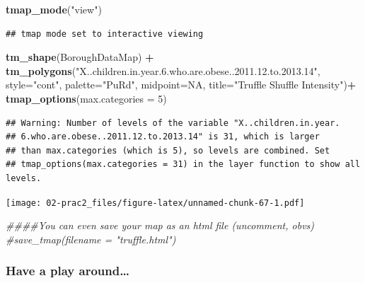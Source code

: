 \documentclass[]{book}
\newenvironment{Shaded}{\begin{snugshade}}{\end{snugshade}}
\newcommand{\CommentTok}[1]{\textcolor[rgb]{0.56,0.35,0.01}{\textit{#1}}}
\newcommand{\DataTypeTok}[1]{\textcolor[rgb]{0.13,0.29,0.53}{#1}}
\newcommand{\DecValTok}[1]{\textcolor[rgb]{0.00,0.00,0.81}{#1}}
\newcommand{\KeywordTok}[1]{\textcolor[rgb]{0.13,0.29,0.53}{\textbf{#1}}}
\newcommand{\NormalTok}[1]{#1}
\newcommand{\OperatorTok}[1]{\textcolor[rgb]{0.81,0.36,0.00}{\textbf{#1}}}
\newcommand{\OtherTok}[1]{\textcolor[rgb]{0.56,0.35,0.01}{#1}}
\newcommand{\StringTok}[1]{\textcolor[rgb]{0.31,0.60,0.02}{#1}}
\begin{document}
\begin{Shaded}
\begin{Highlighting}[]
\KeywordTok{tmap_mode}\NormalTok{(}\StringTok{"view"}\NormalTok{)}
\end{Highlighting}
\end{Shaded}

\begin{verbatim}
## tmap mode set to interactive viewing
\end{verbatim}

\begin{Shaded}
\begin{Highlighting}[]
\KeywordTok{tm_shape}\NormalTok{(BoroughDataMap) }\OperatorTok{+}
\StringTok{    }\KeywordTok{tm_polygons}\NormalTok{(}\StringTok{"X..children.in.year.6.who.are.obese..2011.12.to.2013.14"}\NormalTok{,}
        \DataTypeTok{style=}\StringTok{"cont"}\NormalTok{,}
        \DataTypeTok{palette=}\StringTok{"PuRd"}\NormalTok{,}
        \DataTypeTok{midpoint=}\OtherTok{NA}\NormalTok{,}
        \DataTypeTok{title=}\StringTok{"Truffle Shuffle Intensity"}\NormalTok{)}\OperatorTok{+}
\StringTok{    }\KeywordTok{tmap_options}\NormalTok{(}\DataTypeTok{max.categories =} \DecValTok{5}\NormalTok{)}
\end{Highlighting}
\end{Shaded}

\begin{verbatim}
## Warning: Number of levels of the variable "X..children.in.year.
## 6.who.are.obese..2011.12.to.2013.14" is 31, which is larger
## than max.categories (which is 5), so levels are combined. Set
## tmap_options(max.categories = 31) in the layer function to show all levels.
\end{verbatim}

\texttt{[image: 02-prac2\_files/figure-latex/unnamed-chunk-67-1.pdf]}

\begin{Shaded}
\begin{Highlighting}[]
\CommentTok{####You can even save your map as an html file (uncomment, obvs)}
\CommentTok{#save_tmap(filename = "truffle.html")}
\end{Highlighting}
\end{Shaded}

\hypertarget{have-a-play-around}{%
\subsubsection{Have a play around\ldots{}}\label{have-a-play-around}}
\end{document}
